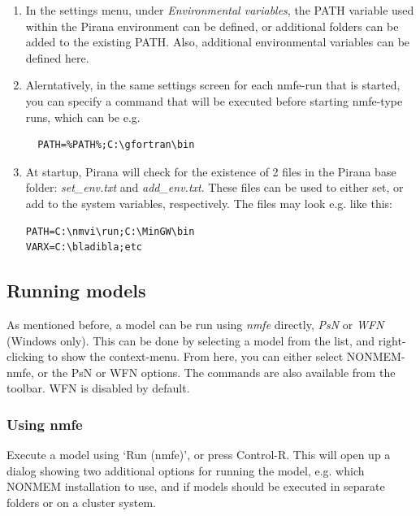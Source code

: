 {{\begin{enumerate}
\item In the settings menu, under \textit{Environmental variables},
  the PATH variable used within the Pirana environment can be defined,
  or additional folders can be added to the existing PATH. Also,
  additional environmental variables can be defined here.

\item Alerntatively, in the same settings screen for each nmfe-run
  that is started, you can specify a command that will be executed
  before starting nmfe-type runs, which can be e.g.

\begin{lstlisting}
  PATH=%PATH%;C:\gfortran\bin
\end{lstlisting}

\item At startup, Pirana will check for the existence of 2 files in
  the Pirana base folder: \textit{set\_env.txt} and
  \textit{add\_env.txt}. These files can be used to either set, or add
  to the system variables, respectively. The files may look e.g. like
  this:

\begin{lstlisting}
PATH=C:\nmvi\run;C:\MinGW\bin
VARX=C:\bladibla;etc
\end{lstlisting}
\end{enumerate}

\clearpage
\subsection{Running models}
As mentioned before, a model can be run using \textit{nmfe} directly, \textit{PsN} or
\textit{WFN} (Windows only). This can be done by selecting a model from the list, and
right-clicking to show the context-menu.  From here, you can either
select NONMEM-nmfe, or the PsN or WFN options. The commands are also
available from the toolbar. WFN is disabled by default.

\subsubsection*{Using nmfe}
Execute a model using `Run (nmfe)', or press Control-R. This will open up a
dialog showing two additional options
for running the model, e.g. which NONMEM installation to use, and if
models should be executed in separate folders or on a cluster system.

}}
